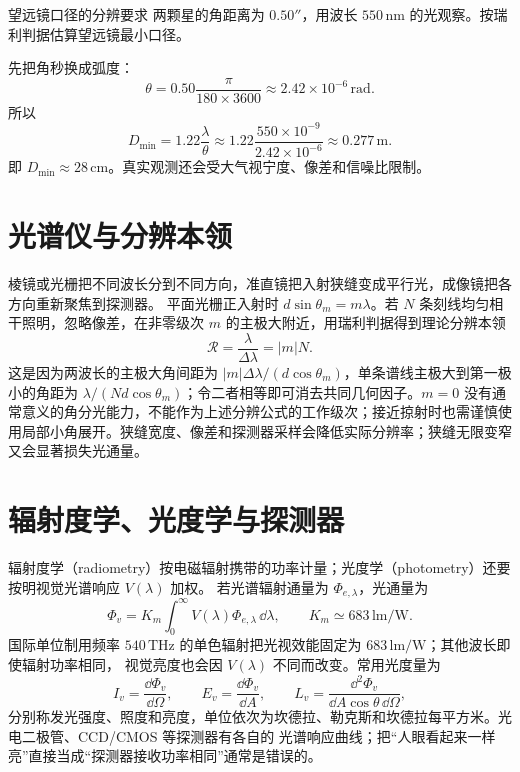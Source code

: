 \begin{origexamplebox}{望远镜口径的分辨要求}
两颗星的角距离为 $0.50''$，用波长 $550\,\mathrm{nm}$ 的光观察。按瑞利判据估算望远镜最小口径。
\end{origexamplebox}
\begin{xesolution}
先把角秒换成弧度：
\[
 \theta=0.50\frac{\pi}{180\times3600}
 \approx2.42\times10^{-6}\,\mathrm{rad}.
\]
所以
\[
 D_{\min}=1.22\frac\lambda\theta
 \approx1.22\frac{550\times10^{-9}}{2.42\times10^{-6}}
 \approx0.277\,\mathrm m.
\]
即 $\boxed{D_{\min}\approx28\,\mathrm{cm}}$。真实观测还会受大气视宁度、像差和信噪比限制。
\end{xesolution}

\section{光谱仪与分辨本领}

棱镜或光栅把不同波长分到不同方向，准直镜把入射狭缝变成平行光，成像镜把各方向重新聚焦到探测器。
平面光栅正入射时 $d\sin\theta_m=m\lambda$。若 $N$ 条刻线均匀相干照明，忽略像差，在非零级次 $m$ 的主极大附近，用瑞利判据得到理论分辨本领
\begin{equation}
 \mathcal R=\frac\lambda{\Delta\lambda}=|m|N.
\end{equation}
这是因为两波长的主极大角间距为 $|m|\Delta\lambda/(d\cos\theta_m)$，单条谱线主极大到第一极小的角距为 $\lambda/(Nd\cos\theta_m)$；令二者相等即可消去共同几何因子。$m=0$ 没有通常意义的角分光能力，不能作为上述分辨公式的工作级次；接近掠射时也需谨慎使用局部小角展开。狭缝宽度、像差和探测器采样会降低实际分辨率；狭缝无限变窄又会显著损失光通量。

\section{辐射度学、光度学与探测器}

辐射度学（radiometry）按电磁辐射携带的功率计量；光度学（photometry）还要按明视觉光谱响应 $V(\lambda)$ 加权。
若光谱辐射通量为 $\Phi_{e,\lambda}$，光通量为
\begin{equation}
 \Phi_v=K_m\int_0^\infty V(\lambda)\Phi_{e,\lambda}\,\dd\lambda,
 \qquad K_m\simeq683\,\mathrm{lm/W}.
\end{equation}
国际单位制用频率 $540\,\mathrm{THz}$ 的单色辐射把光视效能固定为 $683\,\mathrm{lm/W}$；其他波长即使辐射功率相同，
视觉亮度也会因 $V(\lambda)$ 不同而改变。常用光度量为
\begin{equation}
 I_v=\frac{\dd\Phi_v}{\dd\Omega},\qquad
 E_v=\frac{\dd\Phi_v}{\dd A},\qquad
 L_v=\frac{\dd^2\Phi_v}{\dd A\cos\theta\,\dd\Omega},
\end{equation}
分别称发光强度、照度和亮度，单位依次为坎德拉、勒克斯和坎德拉每平方米。光电二极管、CCD/CMOS 等探测器有各自的
光谱响应曲线；把“人眼看起来一样亮”直接当成“探测器接收功率相同”通常是错误的。

